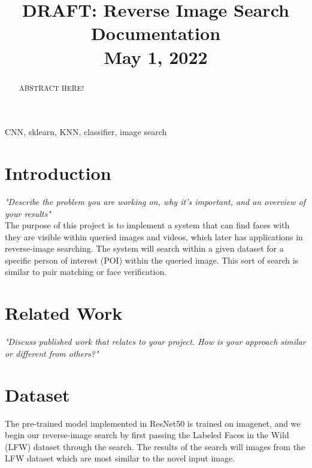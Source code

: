 \documentclass[conference]{IEEEtran}
\begin{document}
\title{DRAFT: Reverse Image Search Documentation\\{\footnotesize May 1, 2022}}

\author{
\and
{}
\and
{}
}

\maketitle

\begin{abstract}
ABSTRACT HERE!
\end{abstract}

\begin{IEEEkeywords}
CNN, sklearn, KNN, classifier, image search
\end{IEEEkeywords}

\section{Introduction}
\textit{"Describe the problem you are working on, why it’s important, and an overview of your results"} \\

The purpose of this project is to implement a system that can find faces with they are visible within queried images and videos, which later has applications in reverse-image searching. The system will search within a given dataset for a specific person of interest (POI) within the queried image. This sort of search is similar to pair matching or face verification.

\section{Related Work}
\textit{"Discuss published work that relates to your project. How is your approach similar or different from others?"}

\section{Dataset}
The pre-trained model implemented in ResNet50 is trained on imagenet, and we begin our reverse-image search by first passing the Labeled Faces in the Wild (LFW) dataset through the search. The results of the search will images from the LFW dataset which are most similar to the novel input image.
\end{document}
